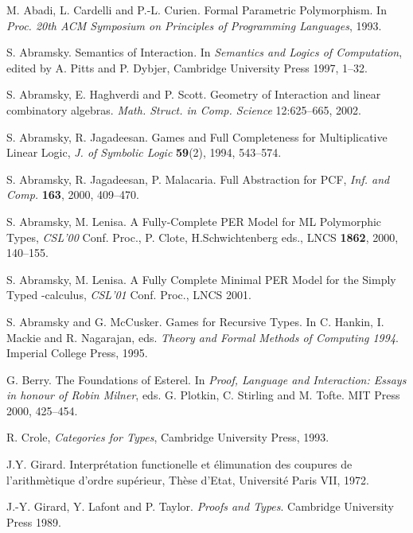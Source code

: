 \documentclass[a4paper,11pt]{article}
\begin{document}
\begin{thebibliography}{DDDD88}

M. Abadi, L. Cardelli and P.-L. Curien.
Formal Parametric Polymorphism.
In {\em Proc. 20th ACM Symposium on Principles of Programming
  Languages}, 1993.

S. Abramsky.
Semantics of Interaction.
In {\em Semantics and Logics of Computation},
edited by A. Pitts and P. Dybjer, Cambridge University Press 1997,
1--32.

S. Abramsky, E. Haghverdi and P. Scott.
Geometry of Interaction and linear combinatory algebras.
{\em Math. Struct. in Comp. Science} 12:625--665, 2002.

 S. Abramsky, R. Jagadeesan. Games and Full Completeness for
 Multiplicative Linear Logic,  {\em J. of Symbolic  Logic} {\bf 59}(2), 1994, 543--574.


 S. Abramsky, R. Jagadeesan, P. Malacaria. Full Abstraction
for PCF,  {\em Inf. and Comp.} {\bf 163}, 2000, 409--470.



 S. Abramsky, M. Lenisa. A Fully-Complete PER Model for ML Polymorphic Types,  {\em CSL'00} Conf. Proc., P. Clote, H.Schwichtenberg eds., LNCS {\bf 1862},
 2000, 140--155.





 S. Abramsky, M. Lenisa. A Fully Complete Minimal
  PER Model for the Simply Typed -calculus, {\em CSL'01}
  Conf. Proc., LNCS 2001.

S. Abramsky and G. McCusker.
Games for Recursive Types.
In C. Hankin, I. Mackie and R. Nagarajan, eds. {\em Theory and Formal
  Methods of Computing 1994}. Imperial College Press, 1995.

G. Berry.
The Foundations of Esterel.
In {\em Proof, Language and Interaction: Essays in honour of Robin
  Milner}, eds. G. Plotkin, C. Stirling and M. Tofte.
MIT Press 2000, 425--454.

 R. Crole, {\em Categories for Types}, Cambridge University Press, 1993.

 J.Y. Girard. Interpr\'etation functionelle et \'elimunation des coupures de l'arithm\`etique d'ordre sup\'erieur, Th\`ese d'Etat, Universit\'e Paris VII, 1972.

J.-Y. Girard, Y. Lafont and P. Taylor.
{\em Proofs and Types}.
Cambridge University Press 1989.


\end{thebibliography}
\end{document}
